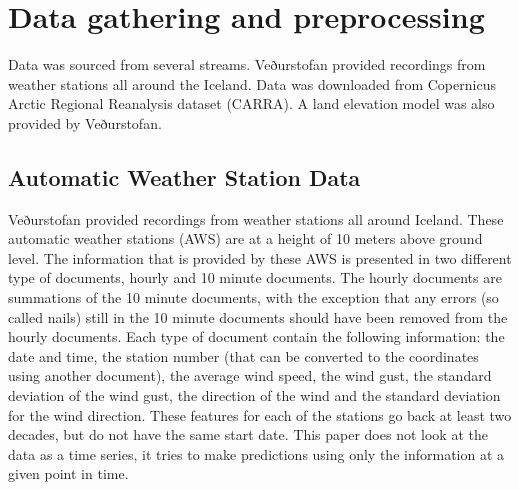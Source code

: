 
\chapter{Data gathering and preprocessing} %

\label{Chapter3} %


Data was sourced from several streams. Veðurstofan provided recordings from weather stations all around the Iceland. Data was downloaded from Copernicus Arctic Regional Reanalysis dataset (CARRA). A land elevation model was also provided by Veðurstofan.

\section{Automatic Weather Station Data}

Veðurstofan provided recordings from weather stations all around Iceland. These automatic weather stations (AWS) are at a height of 10 meters above ground level. The information that is provided by these AWS is presented in two different type of documents, hourly and 10 minute documents. The hourly documents are summations of the 10 minute documents, with the exception that any errors (so called nails) still in the 10 minute documents should have been removed from the hourly documents. Each type of document contain the following information: the date and time, the station number (that can be converted to the coordinates using another document), the average wind speed, the wind gust, the standard deviation of the wind gust, the direction of the wind and the standard deviation for the wind direction. These features for each of the stations go back at least two decades, but do not have the same start date. This paper does not look at the data as a time series, it tries to make predictions using only the information at a given point in time.


